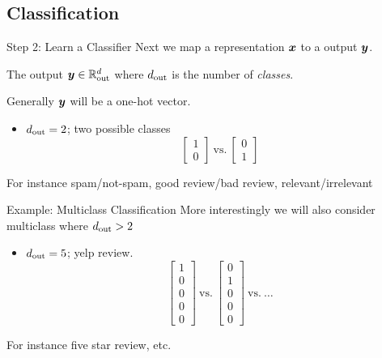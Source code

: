 \documentclass{beamer}
\begin{document}
\subsection{Classification}

\begin{frame}{Step 2: Learn a Classifier}
  Next we map a representation $\boldsymbol{x}$ to a output $\boldsymbol{y}$.
  
  The output $\boldsymbol{y} \in \mathbb{R}^d_{\mathrm{out}}$ where $d_{\mathrm{out}}$ is the number of 
  \textit{classes}. 

  Generally $\boldsymbol{y}$ will be a one-hot vector. 

  \begin{itemize}
  \item $d_{\mathrm{out}} = 2$; two possible classes
    \[ \left[ \begin{matrix} 1 \\ 0  \end{matrix} \right]  \mathrm {\ vs. \ } 
    \left[ \begin{matrix} 0 \\ 1  \end{matrix} \right] \]
  \end{itemize}

  For instance spam/not-spam, good review/bad review, relevant/irrelevant

\end{frame}


\begin{frame}{Example: Multiclass Classification}
  More interestingly we will also consider multiclass where $d_{\mathrm{out}} > 2$

  \begin{itemize}
  \item $d_{\mathrm{out}} = 5$; yelp review.
    \[ \left[ \begin{matrix} 1 \\ 0 \\0 \\0 \\0  \end{matrix} \right]  \mathrm {\ vs. \ } 
    \left[ \begin{matrix} 0 \\ 1 \\0 \\0 \\0  \end{matrix} \right]  \mathrm {\ vs. \ } \ldots \] 
  \end{itemize}
  For instance five star review, etc. 
\end{frame}
\end{document}
